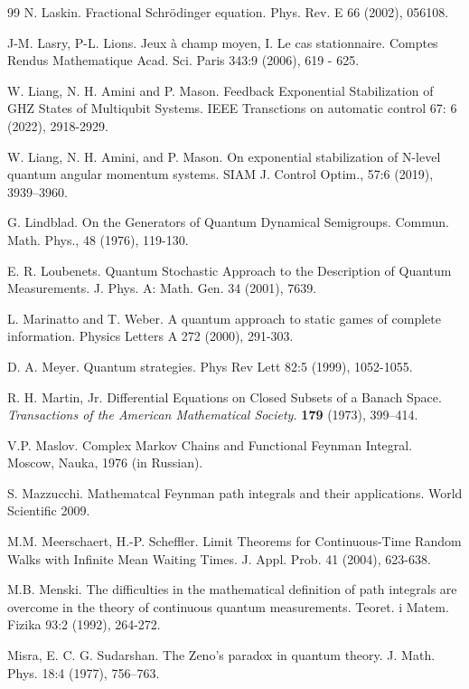 \documentclass[12pt]{article}
\begin{document}
\begin{thebibliography}{99}
 N. Laskin. Fractional Schr\"odinger equation.
Phys. Rev. E 66 (2002), 056108.

J-M. Lasry, P-L. Lions. Jeux \`a champ moyen, I. Le cas stationnaire.
Comptes Rendus Mathematique
 Acad. Sci. Paris 343:9 (2006), 619 - 625.

W. Liang, N. H. Amini and P. Mason.
Feedback Exponential Stabilization of GHZ
States of Multiqubit Systems.
IEEE Transctions on automatic control 67: 6 (2022),
2918-2929.

W. Liang, N. H. Amini, and P. Mason. On exponential stabilization of
N-level quantum angular momentum systems. SIAM J. Control Optim.,
57:6 (2019), 3939–3960.

G. Lindblad. On the Generators of Quantum Dynamical Semigroups.
Commun. Math. Phys., 48 (1976), 119-130.

E. R. Loubenets.
Quantum Stochastic Approach to the Description of
Quantum Measurements.
J. Phys. A: Math. Gen. 34 (2001), 7639.

L. Marinatto and T. Weber. A quantum approach to static games of
complete information.
Physics Letters A 272 (2000), 291-303.

 D. A. Meyer. Quantum strategies. Phys Rev Lett 82:5 (1999), 1052-1055.

R. H. Martin, Jr.
Differential Equations on Closed Subsets of a Banach Space.
\emph{Transactions of the American Mathematical Society.} \textbf{179} (1973),  399--414.

V.P. Maslov. Complex Markov Chains and Functional Feynman Integral.
Mos\-cow, Nauka, 1976 (in Russian).

S. Mazzucchi. Mathematcal Feynman path integrals and their applications.
World Scientific 2009.

 M.M. Meerschaert, H.-P. Scheffler. Limit Theorems for
Continuous-Time Random Walks with Infinite Mean Waiting Times. J.
Appl. Prob.  41 (2004), 623-638.

M.B. Menski. The difficulties in the mathematical definition of path
integrals are overcome in the theory of continuous quantum measurements.
Teoret. i Matem. Fizika 93:2 (1992), 264-272.

Misra, E. C. G. Sudarshan.
The Zeno's paradox in quantum theory. J. Math. Phys. 18:4 (1977),  756–763.


\end{thebibliography}
\end{document}

